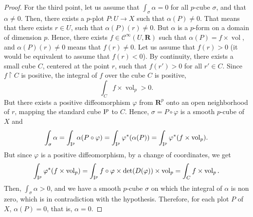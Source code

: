 \documentclass[11pt,reqno]{amsart}
\theoremstyle{definition}
\newcommand{\RR}{{\mathbf R}}
\def \C{{C}}
\def \D{{D}}
\def \P{{P}}
\def \U{{U}}
\def \X{{X}}
\newcommand{\cC}{{\mathcal C}}
\newcommand{\cub}[1]{{\rm I}^{#1}}
\newcommand{\Cinf}{{\cC}^\infty}
\newcommand{\vol}{\operatorname{vol}}
\begin{document}
\begin{proof}
    For the third point, let us assume that $\int_\sigma\alpha = 0$ for
    all $p$-cube $\sigma$, and that $\alpha \neq
    0$. Then, there exists a $p$-plot $\P: \U \to \X$
    such that $\alpha(\P)\neq 0$. That means that there
    exists $r \in \U$, such that $\alpha(\P)(r)\neq 0$.
    But $\alpha$ is a $p$-form on a domain of dimension
    $p$. Hence, there exists $f \in \Cinf(\U,\RR)$ such that
    $\alpha(\P) = f\times \vol$, and
    $\alpha(\P)(r)\neq 0$ means that $f(r)\neq 0$. Let us
    assume that $f(r)>0$ (it would be equivalent to assume
    that $f(r)<0$). By continuity, there exists a small cube $\C$,
    centered at the point $r$, such that $f(r')>0$ for all
    $r' \in \C$. Since $f\restriction {\C}$ is positive,
    the integral of $f$ over the cube ${\C}$ is positive,  
    $$
      \int_{\C} f \times \vol_p > 0. 
    $$ 
    But there exists a
    positive diffeomorphism $\varphi$ from $\RR^p$ onto an
    open neighborhood of $r$, mapping the standard cube
    $\cub{p}$ to $\C$. Hence, $\sigma = \P \circ \varphi$ 
    is a smooth $p$-cube of $\X$ and
    $$ 
      \int_\sigma \alpha = \int_{\cub{p}} \alpha(\P \circ
      \varphi) = \int_{\cub{p}} \varphi^*(\alpha(\P))
      = \int_{\cub{p}} \varphi^*(f \times \vol_p).
      $$
    But since $\varphi$ is a positive diffeomorphism, by a
    change of coordinates, we get
    $$ 
      \int_{\cub{p}} \varphi^*(f \times \vol_p) =
      \int_{\cub{p}} f \circ \varphi \times \det(\D(\varphi))
      \times \vol_p = \int_\C f \times \vol_p.
      $$
    Then, $\displaystyle \int_\sigma \alpha >0$, and we
    have a smooth $p$-cube $\sigma$ on which the integral of
    $\alpha$ is non zero, which is in contradiction with the
    hypothesis. Therefore, for each plot $\P$ of $\X$,
    $\alpha(\P) = 0$, that is, $\alpha = 0$.
  \end{proof}
  
\end{document}

